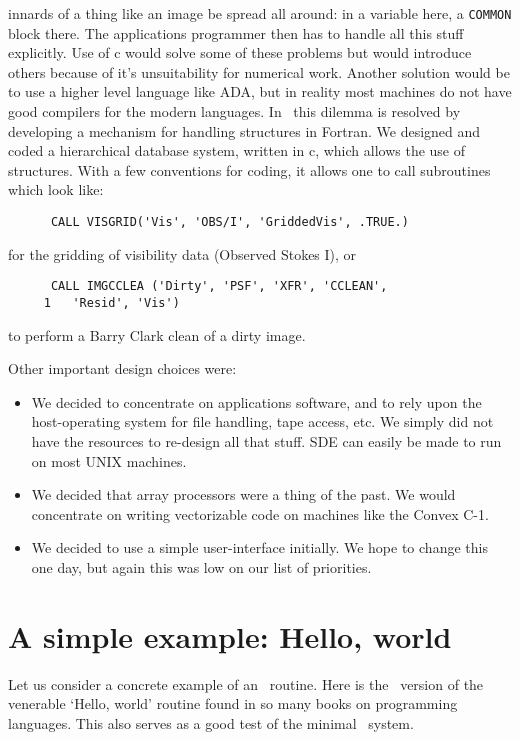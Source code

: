 innards of a thing like an image be spread all around: in a variable here,
a {\tt COMMON} block there. The applications programmer then has to
handle all this stuff explicitly. Use of c would solve some of these
problems but would introduce others because of it's unsuitability for 
numerical work. Another solution would be to use a higher
level language like ADA, but in reality most machines do not have
good compilers for the modern languages. In \sde\ this dilemma is resolved by
developing a mechanism for handling structures in Fortran. We designed
and coded a hierarchical database system, written in c, which allows the use
of structures. With a few conventions for coding, it allows one to
call subroutines which look like:
\begin{verbatim}
      CALL VISGRID('Vis', 'OBS/I', 'GriddedVis', .TRUE.)
\end{verbatim}
for the gridding of visibility data (Observed Stokes I), or
\begin{verbatim}
      CALL IMGCCLEA ('Dirty', 'PSF', 'XFR', 'CCLEAN', 
     1   'Resid', 'Vis')
\end{verbatim}
to perform a Barry Clark clean of a dirty image.

Other important design choices were:
\begin{itemize} 
\item We decided to concentrate on applications software, and to
rely upon the host-operating system for file handling, tape access, etc.
We simply did not have the resources to re-design all that stuff.
SDE can easily be made to run on most UNIX machines.
\item We decided that array processors were a thing of the past. We
would concentrate on writing vectorizable code on machines like the
Convex C-1.
\item We decided to use a simple user-interface initially. We hope to
change this one day, but again this was low on our list of priorities.
\end{itemize}

\newpage
\section{A simple example: Hello, world}

Let us consider a concrete example of an \sde\ routine. Here is the
\sde\ version of the venerable `Hello, world' routine found in
so many books on programming languages. This also serves as a good test of
the minimal \sde\ system.

